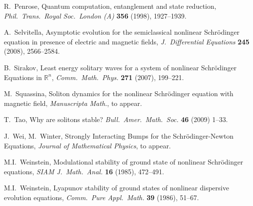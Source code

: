 \documentclass[11pt]{amsart}
\numberwithin{equation}{section}
\theoremstyle{definition}
\begin{document}
\begin{thebibliography}{999999}
{\sc R.\ Penrose}, Quantum computation, entanglement and state
reduction, {\em Phil.\ Trans.\ Royal Soc.\ London (A)} {\bf 356} (1998), 1927--1939.

{\sc A.~Selvitella},
Asymptotic evolution for the semiclassical nonlinear Schr\"odinger equation
in presence of electric and magnetic fields,
{\em J.\ Differential Equations} {\bf 245} (2008), 2566--2584.

{\sc B.~Sirakov},
Least energy solitary waves for a system of nonlinear Schr\"odinger Equations in ${{\mathbb R}}^n$,
{\em Comm.\ Math.\ Phys.} {\bf 271} (2007), 199--221.

{\sc  M.~Squassina},
Soliton dynamics for the nonlinear Schr\"odinger equation with magnetic field,
{\em Manuscripta Math.}, to appear.

{\sc T.~Tao},  Why are solitons stable?
{\em Bull.\ Amer.\ Math.\ Soc.} {\bf 46} (2009) 1--33.

{\sc J.~Wei, M.~Winter},
Strongly Interacting Bumps for the Schr\"odinger-Newton Equations,
{\em Journal of Mathematical Physics}, to appear.

{\sc M.I.~Weinstein},
Modulational stability of ground state of nonlinear Schr\"odinger equations,
{\em SIAM J.\ Math.\ Anal.} {\bf 16} (1985), 472--491.

{\sc M.I.~Weinstein},
Lyapunov stability of ground states of nonlinear dispersive evolution equations,
{\em Comm.\ Pure Appl.\ Math.} {\bf 39} (1986), 51--67.

\end{thebibliography}
\bigskip
\bigskip
\end{document}
